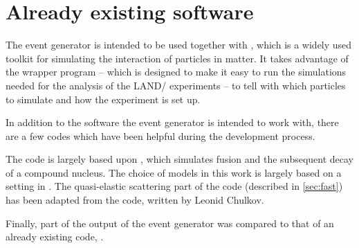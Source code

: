 \section{Already existing software}
The event generator is intended to be used together with , which is a widely used toolkit for simulating the interaction of particles in matter\cite{allison:2006:art}. It takes advantage of the wrapper program \cite{johansson:2013:online} -- which is designed to make it easy to run the simulations needed for the analysis of the LAND/\rtb{} experiments -- to tell with  which particles to simulate and how the experiment is set up.

In addition to the software the event generator is intended to work with, there are a few codes which have been helpful during the development process.

The code is largely based upon \cite{gollerthan:1988:thesis}, which simulates fusion and the subsequent decay of a compound nucleus. The choice of models in this work is largely based on a setting in .
The quasi-elastic scattering part of the code (described in \autoref{sec:fast}) has been adapted from the  code, written by Leonid Chulkov.

Finally, part of the output of the event generator was compared to that of an already existing code, \cite{talys:2015}. 